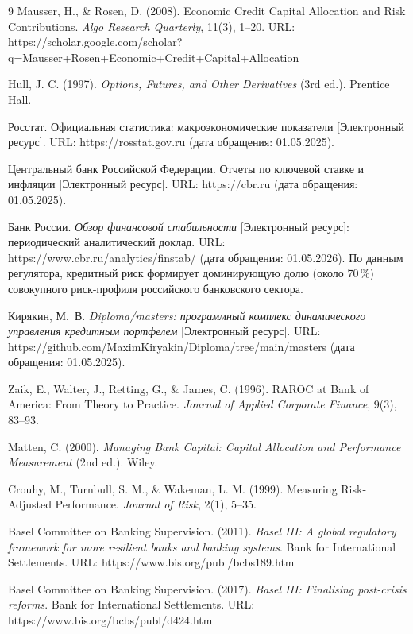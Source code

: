 \documentclass[]{article}
\begin{document}
\begin{thebibliography}{9}
		Mausser, H., \& Rosen, D. (2008). Economic Credit Capital Allocation and Risk Contributions. \textit{Algo Research Quarterly}, 11(3), 1–20. URL: https://scholar.google.com/scholar?q=Mausser+Rosen+Economic+Credit+Capital+Allocation

		Hull, J. C. (1997). \textit{Options, Futures, and Other Derivatives} (3rd ed.). Prentice Hall.

		Росстат. Официальная статистика: макроэкономические показатели [Электронный ресурс]. URL: https://rosstat.gov.ru (дата обращения: 01.05.2025).

		Центральный банк Российской Федерации. Отчеты по ключевой ставке и инфляции [Электронный ресурс]. URL: https://cbr.ru (дата обращения: 01.05.2025).

		Банк России. \textit{Обзор финансовой стабильности} [Электронный ресурс]: периодический аналитический доклад. URL: https://www.cbr.ru/analytics/finstab/ (дата обращения: 01.05.2026). По данным регулятора, кредитный риск формирует доминирующую долю (около 70\,\%) совокупного риск-профиля российского банковского сектора.

		Кирякин, М.~В. \textit{Diploma/masters: программный комплекс динамического управления кредитным портфелем} [Электронный ресурс]. URL: https://github.com/MaximKiryakin/Diploma/tree/main/masters (дата обращения: 01.05.2025).

		Zaik, E., Walter, J., Retting, G., \& James, C. (1996). RAROC at Bank of America: From Theory to Practice. \textit{Journal of Applied Corporate Finance}, 9(3), 83–93.

		Matten, C. (2000). \textit{Managing Bank Capital: Capital Allocation and Performance Measurement} (2nd ed.). Wiley.

		Crouhy, M., Turnbull, S. M., \& Wakeman, L. M. (1999). Measuring Risk-Adjusted Performance. \textit{Journal of Risk}, 2(1), 5–35.

		Basel Committee on Banking Supervision. (2011). \textit{Basel III: A global regulatory framework for more resilient banks and banking systems}. Bank for International Settlements. URL: https://www.bis.org/publ/bcbs189.htm

		Basel Committee on Banking Supervision. (2017). \textit{Basel III: Finalising post-crisis reforms}. Bank for International Settlements. URL: https://www.bis.org/bcbs/publ/d424.htm


\end{thebibliography}
\end{document}
